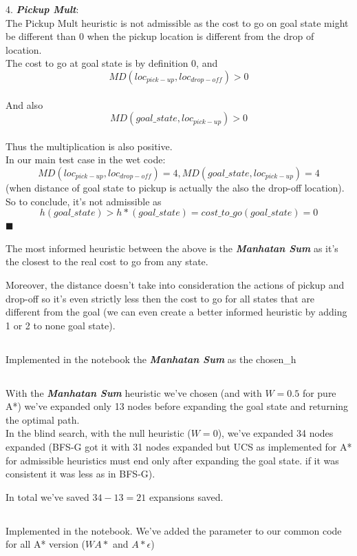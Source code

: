 \documentclass[12pt]{article}
\newcommand{\qed}{\hfill$\blacksquare$}
\begin{document}
4. {\textit{\textbf{Pickup Mult}}}:\\
The Pickup Mult heuristic is not admissible as the cost to go on goal state might be different than 0 when the pickup location is different from the drop of location.\\
The cost to go at goal state is by definition 0, and $$MD(loc_{pick-up},loc_{drop-off}) > 0$$\\
And also
$$MD(goal\_state,loc_{pick-up}) > 0$$\\
Thus the multiplication is also positive.\\
In our main test case in the wet code:
$$MD(loc_{pick-up},loc_{drop-off})=4, MD(goal\_state,loc_{pick-up})=4$$
(when distance of goal state to pickup is actually the also the drop-off location).
So to conclude, it's not admissible as $$h(goal\_state) > h*(goal\_state) = cost\_to\_go(goal\_state) = 0$$
\qed

The most informed heuristic between the above is the {\textit{\textbf{Manhatan Sum}}} as it's the closest to the real cost to go from any state.

Moreover, the distance doesn't take into consideration the actions of pickup and drop-off so it's even strictly less then the cost to go for all states that are different from the goal (we can even create a better informed heuristic by adding 1 or 2 to none goal state).

\subsection{}

Implemented in the notebook the {\textit{\textbf{Manhatan Sum}}} as the chosen\_h

\subsection{}
With the {\textit{\textbf{Manhatan Sum}}} heuristic we've chosen (and with $W=0.5$ for pure A*) we've expanded only 13 nodes before expanding the goal state and returning the optimal path.\\
In the blind search, with the null heuristic ($W=0$), we've expanded 34 nodes  expanded (BFS-G got it with 31 nodes expanded but UCS as implemented for A* for admissible heuristics must end only after expanding the goal state. if it was consistent it was less as in BFS-G).

In total we've saved $34-13=21$ expansions saved.

\subsection{}
Implemented in the notebook. We've added the parameter to our common code for all A* version ($WA*$ and $A*\epsilon$)
\end{document}
